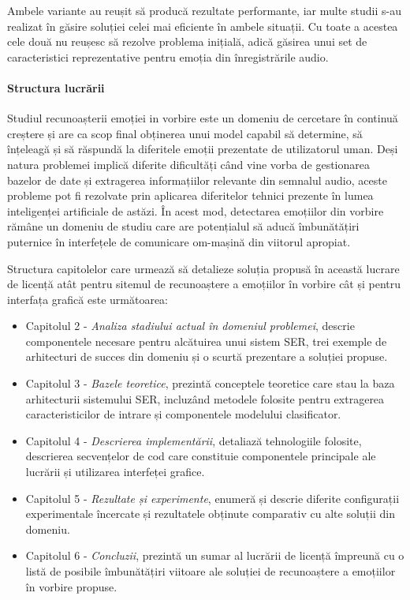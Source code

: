 \documentclass[a4paper,12pt]{book}
\begin{document}
					Ambele variante au reușit să producă rezultate performante, iar multe studii s-au realizat în găsire soluției celei mai eficiente în ambele situații. Cu toate a acestea cele două nu reușesc să rezolve problema inițială, adică găsirea unui set de caracteristici reprezentative pentru emoția din înregistrările audio. \par
					\paragraph{Structura lucrării}
					\hfill \par
					Studiul recunoașterii emoției in vorbire este un domeniu de cercetare în continuă creștere și are ca scop final obținerea unui model capabil să determine, să înțeleagă și să răspundă la diferitele emoții prezentate de utilizatorul uman. Deși natura problemei implică diferite dificultăți când vine vorba de gestionarea bazelor de date și extragerea informațiilor relevante din semnalul audio, aceste probleme pot fi rezolvate prin aplicarea diferitelor tehnici prezente în lumea inteligenței artificiale de astăzi. În acest mod, detectarea emoțiilor din vorbire rămâne un domeniu de studiu care are potențialul să aducă îmbunătățiri puternice în interfețele de comunicare om-mașină din viitorul apropiat. \par
					Structura capitolelor care urmează să detalieze soluția propusă în această lucrare de licență atât pentru sitemul de recunoaștere a emoțiilor în vorbire cât și pentru interfața grafică este următoarea:
					\begin{itemize}
						\item Capitolul 2 - \textit{Analiza stadiului actual în domeniul problemei}, descrie componentele necesare pentru alcătuirea unui sistem SER, trei exemple de arhitecturi de succes din domeniu și o scurtă prezentare a soluției propuse.
						\item Capitolul 3 - \textit{Bazele teoretice}, prezintă conceptele teoretice care stau la baza arhitecturii sistemului SER, incluzând metodele folosite pentru extragerea caracteristicilor de intrare și componentele modelului clasificator. 
						\item Capitolul 4 - \textit{Descrierea implementării}, detaliază tehnologiile folosite, descrierea secvențelor de cod care constituie componentele principale ale lucrării și utilizarea interfeței grafice.
						\item Capitolul 5 - \textit{Rezultate și experimente}, enumeră și descrie diferite configurații experimentale încercate și rezultatele obținute comparativ cu alte soluții din domeniu.
						\item Capitolul 6 - \textit{Concluzii}, prezintă un sumar al lucrării de licență împreună cu o listă de posibile îmbunătățiri viitoare ale soluției de recunoaștere a emoțiilor în vorbire propuse.
					\end{itemize} 
					
\end{document}
